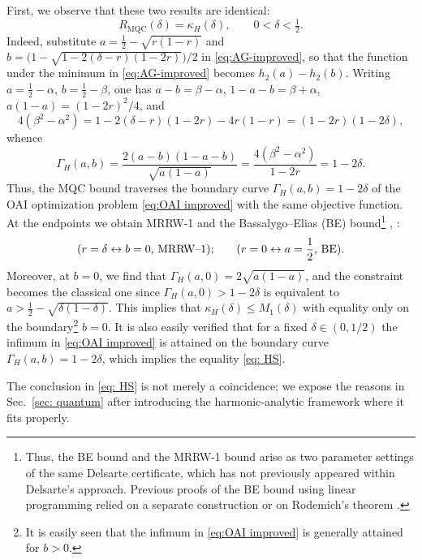 \documentclass[11pt]{amsart}
\theoremstyle{plain}
\theoremstyle{remark}
\begin{document}
First, we observe that these two results are identical:  
   \begin{equation}\label{eq: HS}
 R_{\mathrm{MQC}}(\delta)=\kappa_H(\delta),\qquad0<\delta<\tfrac12.
\end{equation}
Indeed, substitute $a=\frac12-\sqrt{r(1-r)}$ and $b=\bigl(1-\sqrt{1-2(\delta-r)(1-2r)}\bigr)/2$ in \eqref{eq:AG-improved}, so that the 
function under the minimum in \eqref{eq:AG-improved} becomes $h_2(a)-h_2(b)$. Writing $a=\frac12-\alpha$, $b=\frac12-\beta$, one has
$a-b=\beta-\alpha$, $1-a-b=\beta+\alpha$, $a(1-a)=(1-2r)^2/4$, and
\[
 4(\beta^2-\alpha^2)
 =1-2(\delta-r)(1-2r)-4r(1-r)
 =(1-2r)(1-2\delta),
\]
whence
\[
 \Gamma_H(a,b)=\frac{2(a-b)(1-a-b)}{\sqrt{a(1-a)}}
 =\frac{4(\beta^2-\alpha^2)}{1-2r}=1-2\delta.
\]
Thus, the MQC bound traverses the boundary curve $\Gamma_H(a,b)=1-2\delta$ of the OAI optimization problem \eqref{eq:OAI improved} with the same objective function. At the  endpoints we obtain MRRW-1 and the Bassalygo--Elias (BE) bound\footnote{Thus, the BE bound  and the MRRW-1 bound arise as two parameter settings of the same Delsarte certificate, which has not previously appeared within Delsarte's approach. Previous proofs of the BE bound using linear programming relied on a separate construction \cite[pp.~147-149]{Aaltonen1981} or on Rodemich's theorem \cite{delsarte1994application}.} \cite{Bassalygo1965}, \cite[p.93]{HuffmanPless2003}:
   \begin{equation}
\text{($r=\delta\leftrightarrow b=0$, MRRW--1);\qquad  ($r=0\leftrightarrow a=\frac12$,
BE)}.
  \end{equation}
Moreover, at $b=0$, we find that $\Gamma_H(a,0)=2\sqrt{a(1-a)}$, and the constraint becomes
the classical one since $\Gamma_H(a,0)> 1-2\delta$ is equivalent to $a>\frac12-\sqrt{\delta(1-\delta)}$. 
This implies that $\kappa_H(\delta)\le M_1(\delta)$ with equality only on the 
boundary\footnote{It is easily seen that the infimum in \eqref{eq:OAI improved} is generally attained for $b>0$.} $b=0$. 
It is also easily verified that for a fixed $\delta\in(0,1/2)$ the infimum in \eqref{eq:OAI improved} is attained 
on the boundary curve $\Gamma_H(a,b)=1-2\delta$, which implies the equality \eqref{eq: HS}. 


The conclusion in \eqref{eq: HS} is not merely a coincidence; we expose the reasons in Sec.~\ref{sec: quantum} after introducing the harmonic-analytic framework where it fits properly.
\end{document}
